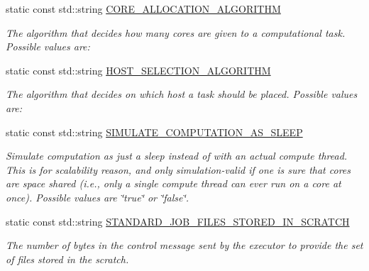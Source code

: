 \begin{DoxyCompactItemize}
\item 
static const std\+::string \hyperlink{classwrench_1_1_standard_job_executor_property_ae5ce6920c874824ce3bc02748a80204f}{C\+O\+R\+E\+\_\+\+A\+L\+L\+O\+C\+A\+T\+I\+O\+N\+\_\+\+A\+L\+G\+O\+R\+I\+T\+HM}
\begin{DoxyCompactList}\small\item\em The algorithm that decides how many cores are given to a computational task. Possible values are\+: \end{DoxyCompactList}\item 
static const std\+::string \hyperlink{classwrench_1_1_standard_job_executor_property_a15a713f4b9f9ba6ebb4ba4498c1d2959}{H\+O\+S\+T\+\_\+\+S\+E\+L\+E\+C\+T\+I\+O\+N\+\_\+\+A\+L\+G\+O\+R\+I\+T\+HM}
\begin{DoxyCompactList}\small\item\em The algorithm that decides on which host a task should be placed. Possible values are\+: \end{DoxyCompactList}\item 
\mbox{\label{classwrench_1_1_standard_job_executor_property_a52911ff1a2857c2b375aac08ad8019a1}} 
static const std\+::string \hyperlink{classwrench_1_1_standard_job_executor_property_a52911ff1a2857c2b375aac08ad8019a1}{S\+I\+M\+U\+L\+A\+T\+E\+\_\+\+C\+O\+M\+P\+U\+T\+A\+T\+I\+O\+N\+\_\+\+A\+S\+\_\+\+S\+L\+E\+EP}
\begin{DoxyCompactList}\small\item\em Simulate computation as just a sleep instead of with an actual compute thread. This is for scalability reason, and only simulation-\/valid if one is sure that cores are space shared (i.\+e., only a single compute thread can ever run on a core at once). Possible values are \char`\"{}true\char`\"{} or \char`\"{}false\char`\"{}. \end{DoxyCompactList}\item 
\mbox{\label{classwrench_1_1_standard_job_executor_property_afe3bbcf355a149223aa8b484e78b9681}} 
static const std\+::string \hyperlink{classwrench_1_1_standard_job_executor_property_afe3bbcf355a149223aa8b484e78b9681}{S\+T\+A\+N\+D\+A\+R\+D\+\_\+\+J\+O\+B\+\_\+\+F\+I\+L\+E\+S\+\_\+\+S\+T\+O\+R\+E\+D\+\_\+\+I\+N\+\_\+\+S\+C\+R\+A\+T\+CH}
\begin{DoxyCompactList}\small\item\em The number of bytes in the control message sent by the executor to provide the set of files stored in the scratch. \end{DoxyCompactList}\item 

\end{DoxyCompactItemize}

